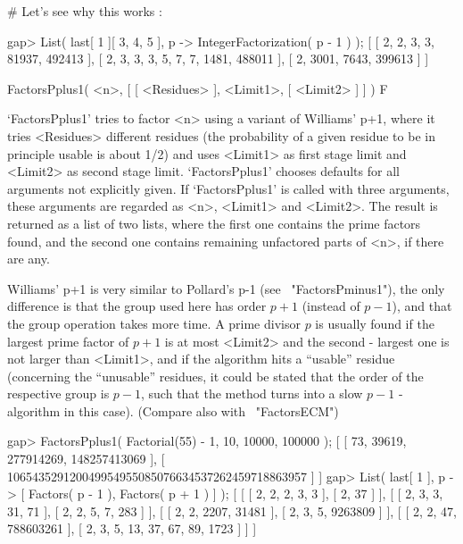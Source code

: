 # Let's see why this works :

gap> List( last[ 1 ]{[ 3, 4, 5 ]}, p -> IntegerFactorization( p - 1 ) );
[ [ 2, 2, 3, 3, 81937, 492413 ], [ 2, 3, 3, 3, 5, 7, 7, 1481, 488011 ], 
  [ 2, 3001, 7643, 399613 ] ]
\endexample


\>FactorsPplus1( <n>, [ [ <Residues> ], <Limit1>, [ <Limit2> ] ] ) F

`FactorsPplus1' tries to factor <n> using a variant of Williams' p+1, 
where it tries <Residues> different residues (the probability of a 
given residue to be in principle usable is about 1/2) and 
uses <Limit1> as first stage limit and <Limit2> as second stage
limit. `FactorsPplus1' chooses defaults for all arguments
not explicitly given.
If `FactorsPplus1' is called with three arguments, these arguments
are regarded as <n>, <Limit1> and <Limit2>.
The result is returned as a list of two lists, where the first one 
contains the prime factors found, and the second one contains
remaining unfactored parts of <n>, if there are any.

Williams' p+1 is very similar to Pollard's p-1 
(see ~"FactorsPminus1"), the only difference is that the group 
used here has order $p+1$ (instead of $p-1$), and that the group
operation takes more time.
A prime divisor $p$ is usually found if the largest prime factor
of $p+1$ is at most <Limit2> and the second - largest one is not
larger than <Limit1>, and if the algorithm hits a ``usable''
residue (concerning the ``unusable'' residues, it could be stated
that the order of the respective group is $p-1$, such that
the method turns into a slow $p-1$ - algorithm in this case).
(Compare also with ~"FactorsECM")

\beginexample
gap> FactorsPplus1( Factorial(55) - 1, 10, 10000, 100000 );
[ [ 73, 39619, 277914269, 148257413069 ], 
  [ 106543529120049954955085076634537262459718863957 ] ]
gap> List( last[ 1 ], p -> [ Factors( p - 1 ), Factors( p + 1 ) ] );
[ [ [ 2, 2, 2, 3, 3 ], [ 2, 37 ] ], 
  [ [ 2, 3, 3, 31, 71 ], [ 2, 2, 5, 7, 283 ] ], 
  [ [ 2, 2, 2207, 31481 ], [ 2, 3, 5, 9263809 ] ], 
  [ [ 2, 2, 47, 788603261 ], [ 2, 3, 5, 13, 37, 67, 89, 1723 ] ] ]
\endexample



